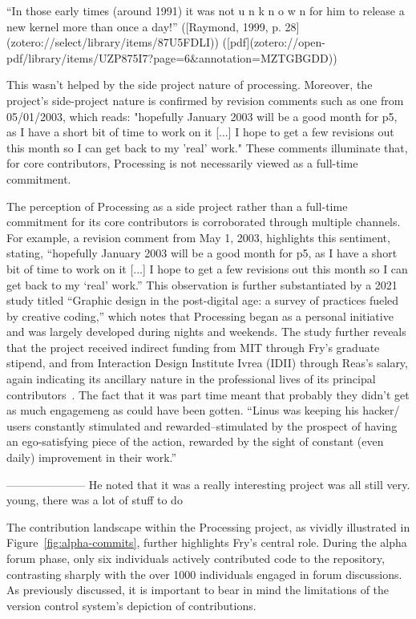“In those early times (around 1991) it was not u n k n o w n for him to release a new kernel more than once a day!” ([Raymond, 1999, p. 28](zotero://select/library/items/87U5FDLI)) ([pdf](zotero://open-pdf/library/items/UZP875I7?page=6&annotation=MZTGBGDD))

This wasn't helped by the side project nature of processing.  
Moreover, the project’s side-project nature is confirmed by revision comments such as one from 05/01/2003, which reads: "hopefully January 2003 will be a good month for p5, as I have a short bit of time to work on it [...] I hope to get a few revisions out this month so I can get back to my 'real' work." These comments illuminate that, for core contributors, Processing is not necessarily viewed as a full-time commitment.

The perception of Processing as a side project rather than a full-time commitment for its core contributors is corroborated through multiple channels. For example, a revision comment from May 1, 2003, highlights this sentiment, stating, ``hopefully January 2003 will be a good month for p5, as I have a short bit of time to work on it [...] I hope to get a few revisions out this month so I can get back to my `real' work.'' This observation is further substantiated by a 2021 study titled ``Graphic design in the post-digital age: a survey of practices fueled by creative coding,'' which notes that Processing began as a personal initiative and was largely developed during nights and weekends. The study further reveals that the project received indirect funding from MIT through Fry's graduate stipend, and from Interaction Design Institute Ivrea (IDII) through Reas's salary, again indicating its ancillary nature in the professional lives of its principal contributors~\parencite[396]{conradGraphicDesignPostdigital2021}.
The fact that it was part time meant that probably they didn't get as much engagemeng as could have been gotten.
“Linus was keeping his hacker/ users constantly stimulated and rewarded--stimulated by the prospect of having an ego-satisfying piece of the action, rewarded by the sight of constant (even daily) improvement in their work.”

---------------------
He noted that it was a really interesting project was all still very. young, there was a lot of stuff to do

The contribution landscape within the Processing project, as vividly illustrated in Figure~\ref{fig:alpha-commits}, further highlights Fry's central role. During the alpha forum phase, only six individuals actively contributed code to the repository, contrasting sharply with the over 1000 individuals engaged in forum discussions. As previously discussed, it is important to bear in mind the limitations of the version control system's depiction of contributions.

